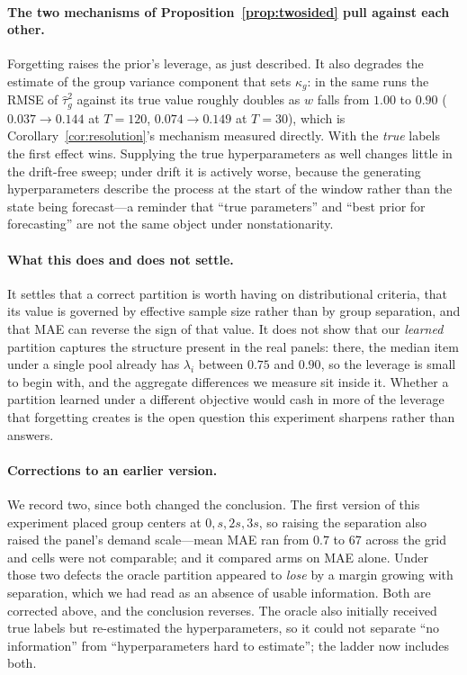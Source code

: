 \documentclass[twocolumn,10pt]{article}
\begin{document}
\paragraph{The two mechanisms of Proposition~\ref{prop:twosided} pull
against each other.} Forgetting raises the prior's leverage, as just
described. It also degrades the estimate of the group variance component
that sets $\kappa_g$: in the same runs the RMSE of $\hat\tau_g^2$ against
its true value roughly doubles as $w$ falls from $1.00$ to $0.90$
($0.037\to0.144$ at $T{=}120$, $0.074\to0.149$ at $T{=}30$), which is
Corollary~\ref{cor:resolution}'s mechanism measured directly. With the
\emph{true} labels the first effect wins. Supplying the true
hyperparameters as well changes little in the drift-free sweep; under
drift it is actively worse, because the generating hyperparameters
describe the process at the start of the window rather than the state
being forecast---a reminder that ``true parameters'' and ``best prior
for forecasting'' are not the same object under nonstationarity.

\paragraph{What this does and does not settle.} It settles that a correct
partition is worth having on distributional criteria, that its value is
governed by effective sample size rather than by group separation, and
that MAE can reverse the sign of that value. It does not show that our
\emph{learned} partition captures the structure present in the real
panels: there, the median item under a single pool already has
$\lambda_i$ between $0.75$ and $0.90$, so the leverage is small to begin
with, and the aggregate differences we measure sit inside it. Whether a
partition learned under a different objective would cash in more of the
leverage that forgetting creates is the open question this experiment
sharpens rather than answers.

\paragraph{Corrections to an earlier version.} We record two, since both
changed the conclusion. The first version of this experiment placed group
centers at $0,s,2s,3s$, so raising the separation also raised the panel's
demand scale---mean MAE ran from $0.7$ to $67$ across the grid and cells
were not comparable; and it compared arms on MAE alone. Under those two
defects the oracle partition appeared to \emph{lose} by a margin growing
with separation, which we had read as an absence of usable information.
Both are corrected above, and the conclusion reverses. The oracle also
initially received true labels but re-estimated the hyperparameters, so
it could not separate ``no information'' from ``hyperparameters hard to
estimate''; the ladder now includes both.
\end{document}
